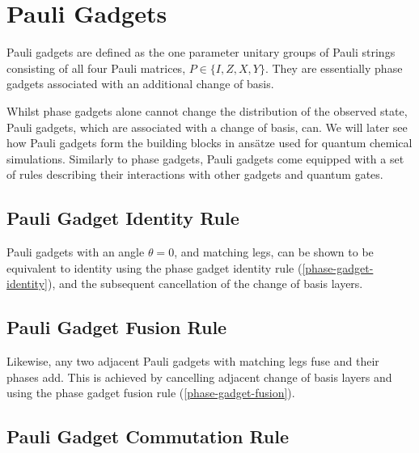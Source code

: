 \section{Pauli Gadgets}

Pauli gadgets are defined as the one parameter unitary groups of Pauli strings consisting of all four Pauli matrices, $P \in \{I, Z, X, Y\}$. They are essentially phase gadgets associated with an additional change of basis.


Whilst phase gadgets alone cannot change the distribution of the observed state, Pauli gadgets, which are associated with a change of basis, can. We will later see how Pauli gadgets form the building blocks in ansätze used for quantum chemical simulations. Similarly to phase gadgets, Pauli gadgets come equipped with a set of rules describing their interactions with other gadgets and quantum gates.


\subsection{Pauli Gadget Identity Rule}%
\label{pauli-gadget-identity}

Pauli gadgets with an angle $\theta = 0$, and matching legs, can be shown to be equivalent to identity using the phase gadget identity rule (\ref{phase-gadget-identity}), and the subsequent cancellation of the change of basis layers.



\subsection{Pauli Gadget Fusion Rule}%
\label{pauli-gadget-fusion}

Likewise, any two adjacent Pauli gadgets with matching legs fuse and their phases add. This is achieved by cancelling adjacent change of basis layers and using the phase gadget fusion rule (\ref{phase-gadget-fusion}).



\subsection{Pauli Gadget Commutation Rule}%
\label{pauli-gadget-commutation}

